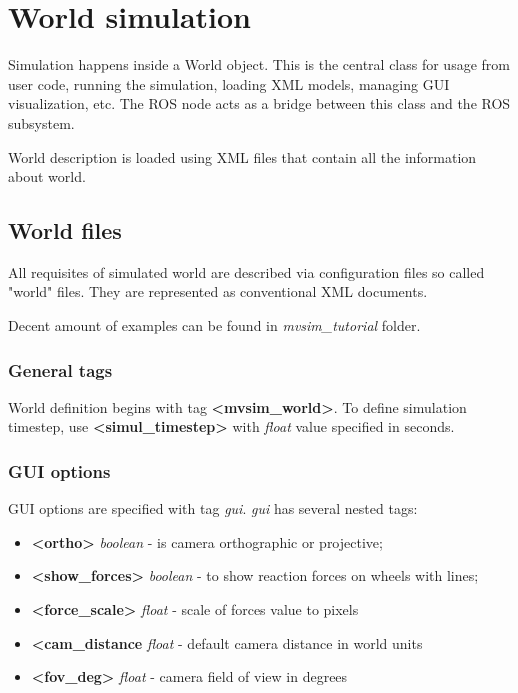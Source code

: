 \documentclass[a4paper,11pt]{article}
\begin{document}
\newpage

\section{World simulation}
Simulation happens inside a World object.
This is the central class for usage from user code, running the simulation, loading XML models, managing GUI visualization, etc.
The ROS node acts as a bridge between this class and the ROS subsystem.

World description is loaded using XML files that contain all the information about world.

\subsection{World files}

All requisites of simulated world are described via configuration files so called "world" files. They are represented as conventional XML documents.

Decent amount of examples can be found in \textit{mvsim\_tutorial} folder.

\subsubsection{General tags}
World definition begins with tag \textbf{\textless mvsim\_world\textgreater}. To define simulation timestep, use \textbf{\textless simul\_timestep\textgreater} with \textit{float} value specified in seconds. 

\subsubsection{GUI options}
GUI options are specified with tag \textit{gui}. \textit{gui} has several nested tags:

\begin{itemize}
	\item \textbf{\textless ortho\textgreater } \textit{boolean} - is camera orthographic or projective;
	\item \textbf{\textless show\_forces\textgreater } \textit{boolean} - to show reaction forces on wheels with lines;
	\item \textbf{\textless force\_scale\textgreater } \textit{float} - scale of forces value to pixels
	\item \textbf{\textless cam\_distance} \textit{float} - default camera distance in world units
	\item \textbf{\textless fov\_deg\textgreater } \textit{float} - camera field of view in degrees
\end{itemize}
	
\end{document}
